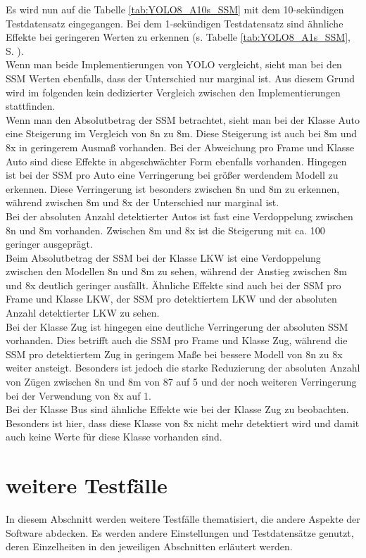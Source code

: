 {\begin{table}[h]
\begin{tabular}{l|l|l|l|l|l|l}
	\end{tabular}
	\end{table}
	Es wird nun auf die Tabelle \ref{tab:YOLO8_A10s_SSM} mit dem 10-sekündigen Testdatensatz eingegangen. Bei dem 1-sekündigen Testdatensatz sind ähnliche Effekte bei geringeren Werten zu erkennen (s. Tabelle \ref{tab:YOLO8_A1s_SSM}, S. \pageref{tab:YOLO8_A1s_SSM}). \\
	Wenn man beide Implementierungen von YOLO vergleicht, sieht man bei den SSM Werten ebenfalls, dass der Unterschied nur marginal ist. Aus diesem Grund wird im folgenden kein dedizierter Vergleich zwischen den Implementierungen stattfinden. \\
	Wenn man den Absolutbetrag der SSM betrachtet, sieht man bei der Klasse Auto eine Steigerung im Vergleich von 8n zu 8m. Diese Steigerung ist auch bei 8m und 8x in geringerem Ausmaß vorhanden. Bei der Abweichung pro Frame und Klasse Auto sind diese Effekte in abgeschwächter Form ebenfalls vorhanden. Hingegen ist bei der SSM pro Auto eine Verringerung bei größer werdendem Modell zu erkennen. Diese Verringerung ist besonders zwischen 8n und 8m zu erkennen, während zwischen 8m und 8x der Unterschied nur marginal ist. \\
	Bei der absoluten Anzahl detektierter Autos ist fast eine Verdoppelung zwischen 8n und 8m vorhanden. Zwischen 8m und 8x ist die Steigerung mit ca. 100 geringer ausgeprägt. \\
	Beim Absolutbetrag der SSM bei der Klasse LKW ist eine Verdoppelung zwischen den Modellen 8n und 8m zu sehen, während der Anstieg zwischen 8m und 8x deutlich geringer ausfällt. Ähnliche Effekte sind auch bei der SSM pro Frame und Klasse LKW, der SSM pro detektiertem LKW und der absoluten Anzahl detektierter LKW zu sehen. \\
	Bei der Klasse Zug ist hingegen eine deutliche Verringerung der absoluten SSM vorhanden. Dies betrifft auch die SSM pro Frame und Klasse Zug, während die SSM pro detektiertem Zug in geringem Maße bei bessere Modell von 8n zu 8x weiter ansteigt. Besonders ist jedoch die starke Reduzierung der absoluten Anzahl von Zügen zwischen 8n und 8m von 87 auf 5 und der noch weiteren Verringerung bei der Verwendung von 8x auf 1. \\
	Bei der Klasse Bus sind ähnliche Effekte wie bei der Klasse Zug zu beobachten. Besonders ist hier, dass diese Klasse von 8x nicht mehr detektiert wird und damit auch keine Werte für diese Klasse vorhanden sind.	
} 

\section{weitere Testfälle}
{
	In diesem Abschnitt werden weitere Testfälle thematisiert, die andere Aspekte der Software abdecken. Es werden andere Einstellungen und Testdatensätze genutzt, deren Einzelheiten in den jeweiligen Abschnitten erläutert werden.

}
